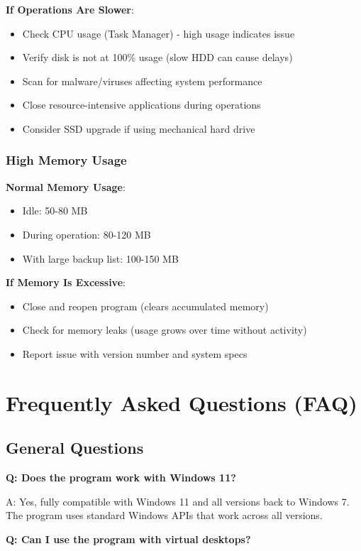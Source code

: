 \documentclass[a4paper,11pt]{article}
\begin{document}
\textbf{If Operations Are Slower}:
\begin{itemize}
  \item Check CPU usage (Task Manager) - high usage indicates issue
  \item Verify disk is not at 100\% usage (slow HDD can cause delays)
  \item Scan for malware/viruses affecting system performance
  \item Close resource-intensive applications during operations
  \item Consider SSD upgrade if using mechanical hard drive
\end{itemize}

\subsubsection{High Memory Usage}

\textbf{Normal Memory Usage}:
\begin{itemize}
  \item Idle: 50-80 MB
  \item During operation: 80-120 MB
  \item With large backup list: 100-150 MB
\end{itemize}

\textbf{If Memory Is Excessive}:
\begin{itemize}
  \item Close and reopen program (clears accumulated memory)
  \item Check for memory leaks (usage grows over time without activity)
  \item Report issue with version number and system specs
\end{itemize}

\section{Frequently Asked Questions (FAQ)}

\subsection{General Questions}

\textbf{Q: Does the program work with Windows 11?}

A: Yes, fully compatible with Windows 11 and all versions back to
Windows 7. The program uses standard Windows APIs that work across all versions.

\textbf{Q: Can I use the program with virtual desktops?}
\end{document}
